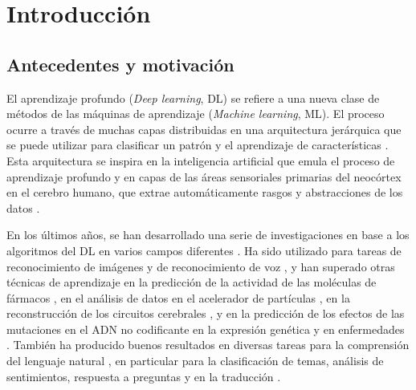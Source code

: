 \chapter{Introducción}
\section{Antecedentes y motivación}
El aprendizaje profundo ({\em Deep learning}, DL) se refiere a una nueva clase de métodos de las máquinas de aprendizaje ({\em Machine learning}, ML). El proceso ocurre a través de muchas capas distribuidas en una arquitectura jerárquica que se puede utilizar para clasificar un patrón y el aprendizaje de características \cite{Hinton2006, Bengio2009}. Esta arquitectura se inspira en la inteligencia artificial que emula el proceso de aprendizaje profundo y en capas de las áreas sensoriales primarias del neocórtex en el cerebro humano, que extrae automáticamente rasgos y abstracciones de los datos \cite{Bengio2007, Bengio2013, Arel2010}.

En los últimos años, se han desarrollado una serie de investigaciones en base a los algoritmos del DL en varios campos diferentes \cite{LeCun2015}. Ha sido utilizado para tareas de reconocimiento de imágenes \cite{Krizhevsky2012, Farabet2013, Tompson2014, Szegedy2015} y de reconocimiento de voz \cite{Mikolov2011, Hinton2012, Sainath2013}, y han superado otras técnicas de aprendizaje en la predicción de la actividad de las moléculas de fármacos \cite{Ma2015}, en el análisis de datos en el acelerador de partículas \cite{Ciodaro2012, Claire2015}, en la reconstrucción de los circuitos cerebrales \cite{Helmstaedter2013}, y en la predicción de los efectos de las mutaciones en el ADN no codificante en la expresión genética y en enfermedades \cite{Leung2014, Xiong2015}. También ha producido buenos resultados en diversas tareas para la comprensión del lenguaje natural \cite{Collobert2011}, en particular para la clasificación de temas, análisis de sentimientos, respuesta a preguntas \cite{Bordes2014} y en la traducción \cite{Jean2014, Sutskever2014}.




